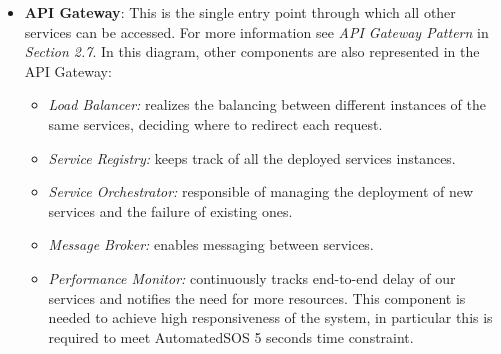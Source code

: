 \begin{itemize}
	\item \textbf{API Gateway}: This is the single entry point through which all other services can be accessed. For more information see \textit{API Gateway Pattern} in \textit{Section 2.7}. In this diagram, other components are also represented in the API Gateway:
	
	\begin{itemize}
		\item \textit{Load Balancer:} realizes the balancing between different instances of the same services, deciding where to redirect each request.
		\item \textit{Service Registry:} keeps track of all the deployed services instances.
		\item \textit{Service Orchestrator:} responsible of managing the deployment of new services and the failure of existing ones.
		\item \textit{Message Broker:} enables messaging between services.
		\item \textit{Performance Monitor:} continuously tracks end-to-end delay of our services and notifies the need for more resources. This component is needed to achieve high responsiveness of the system, in particular this is required to meet AutomatedSOS 5 seconds time constraint. 
	\end{itemize}
	

\end{itemize}
